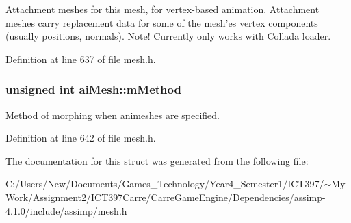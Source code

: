 Attachment meshes for this mesh, for vertex-based animation. Attachment meshes carry replacement data for some of the mesh'es vertex components (usually positions, normals). Note! Currently only works with Collada loader. 

Definition at line 637 of file mesh.h.\hypertarget{structai_mesh_3a6c8c5f1d6543bfdd930f6b07467665}{
\subsubsection[mMethod]{\setlength{\rightskip}{0pt plus 5cm}unsigned int {\bf aiMesh::mMethod}}}
\label{structai_mesh_3a6c8c5f1d6543bfdd930f6b07467665}


Method of morphing when animeshes are specified. 

Definition at line 642 of file mesh.h.

The documentation for this struct was generated from the following file:\begin{CompactItemize}
\item 
C:/Users/New/Documents/Games\_\-Technology/Year4\_\-Semester1/ICT397/$\sim$My Work/Assignment2/ICT397Carre/CarreGameEngine/Dependencies/assimp-4.1.0/include/assimp/mesh.h\end{CompactItemize}
